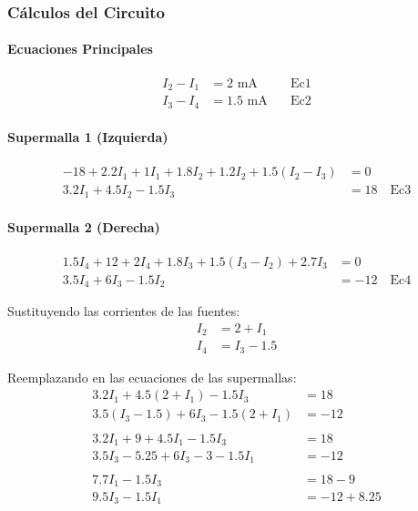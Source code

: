 \documentclass[conference]{IEEEtran}
\begin{document}
\subsubsection{Cálculos del Circuito}

\paragraph{Ecuaciones Principales}
\begin{align*}
    I_2 - I_1 &= 2\text{ mA} \quad &\text{Ec1} \\
    I_3 - I_4 &= 1.5\text{ mA} \quad &\text{Ec2}
\end{align*}

\paragraph{Supermalla 1 (Izquierda)}
\begin{align*}
    -18 + 2.2I_1 + 1I_1 + 1.8I_2 + 1.2I_2 + 1.5(I_2 - I_3) &= 0 \\
    3.2I_1 + 4.5I_2 - 1.5I_3 &= 18 \quad \text{Ec3}
\end{align*}

\paragraph{Supermalla 2 (Derecha)}
\begin{align*}
    1.5I_4 + 12 + 2I_4 + 1.8I_3 + 1.5(I_3 - I_2) + 2.7I_3 &= 0 \\
    3.5I_4 + 6I_3 - 1.5I_2 &= -12 \quad \text{Ec4}
\end{align*}

Sustituyendo las corrientes de las fuentes:
\begin{align*}
    I_2 &= 2 + I_1 \\
    I_4 &= I_3 - 1.5
\end{align*}

Reemplazando en las ecuaciones de las supermallas:
\begin{align*}
    3.2I_1 + 4.5(2 + I_1) - 1.5I_3 &= 18 \\
    3.5(I_3 - 1.5) + 6I_3 - 1.5(2 + I_1) &= -12 \\
    \\
    3.2I_1 + 9 + 4.5I_1 - 1.5I_3 &= 18 \\
    3.5I_3 - 5.25 + 6I_3 - 3 - 1.5I_1 &= -12 \\
    \\
    7.7I_1 - 1.5I_3 &= 18 - 9 \\
    9.5I_3 - 1.5I_1 &= -12 + 8.25
\end{align*}
\end{document}
